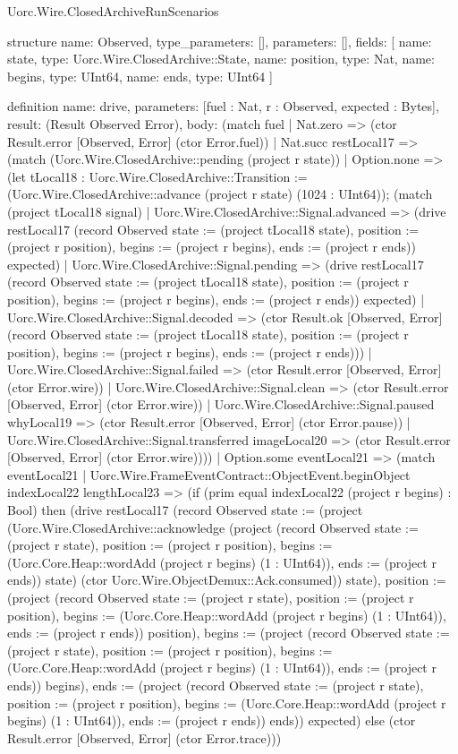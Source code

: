 \begin{lexlean}{Uorc.Wire.ClosedArchiveRunScenarios}
\begin{semanticmodule}
structure{
  name: Observed,
  type_parameters: [],
  parameters: [],
  fields: [
    {name: state, type: Uorc.Wire.ClosedArchive::State},
    {name: position, type: Nat},
    {name: begins, type: UInt64},
    {name: ends, type: UInt64}
  ]
}

definition{
  name: drive,
  parameters: [fuel : Nat, r : Observed, expected : Bytes],
  result: (Result Observed Error),
  body: (match fuel
    | Nat.zero => (ctor Result.error [Observed, Error] (ctor Error.fuel))
    | Nat.succ restLocal17 => (match (Uorc.Wire.ClosedArchive::pending (project r state))
      | Option.none => (let tLocal18 : Uorc.Wire.ClosedArchive::Transition := (Uorc.Wire.ClosedArchive::advance (project r state) (1024 : UInt64)); (match (project tLocal18 signal)
        | Uorc.Wire.ClosedArchive::Signal.advanced => (drive restLocal17 (record Observed {state := (project tLocal18 state), position := (project r position), begins := (project r begins), ends := (project r ends)}) expected)
        | Uorc.Wire.ClosedArchive::Signal.pending => (drive restLocal17 (record Observed {state := (project tLocal18 state), position := (project r position), begins := (project r begins), ends := (project r ends)}) expected)
        | Uorc.Wire.ClosedArchive::Signal.decoded => (ctor Result.ok [Observed, Error] (record Observed {state := (project tLocal18 state), position := (project r position), begins := (project r begins), ends := (project r ends)}))
        | Uorc.Wire.ClosedArchive::Signal.failed => (ctor Result.error [Observed, Error] (ctor Error.wire))
        | Uorc.Wire.ClosedArchive::Signal.clean => (ctor Result.error [Observed, Error] (ctor Error.wire))
        | Uorc.Wire.ClosedArchive::Signal.paused whyLocal19 => (ctor Result.error [Observed, Error] (ctor Error.pause))
        | Uorc.Wire.ClosedArchive::Signal.transferred imageLocal20 => (ctor Result.error [Observed, Error] (ctor Error.wire))))
      | Option.some eventLocal21 => (match eventLocal21
        | Uorc.Wire.FrameEventContract::ObjectEvent.beginObject indexLocal22 lengthLocal23 => (if (prim equal indexLocal22 (project r begins) : Bool) then (drive restLocal17 (record Observed {state := (project (Uorc.Wire.ClosedArchive::acknowledge (project (record Observed {state := (project r state), position := (project r position), begins := (Uorc.Core.Heap::wordAdd (project r begins) (1 : UInt64)), ends := (project r ends)}) state) (ctor Uorc.Wire.ObjectDemux::Ack.consumed)) state), position := (project (record Observed {state := (project r state), position := (project r position), begins := (Uorc.Core.Heap::wordAdd (project r begins) (1 : UInt64)), ends := (project r ends)}) position), begins := (project (record Observed {state := (project r state), position := (project r position), begins := (Uorc.Core.Heap::wordAdd (project r begins) (1 : UInt64)), ends := (project r ends)}) begins), ends := (project (record Observed {state := (project r state), position := (project r position), begins := (Uorc.Core.Heap::wordAdd (project r begins) (1 : UInt64)), ends := (project r ends)}) ends)}) expected) else (ctor Result.error [Observed, Error] (ctor Error.trace)))
}
\end{semanticmodule}
\end{lexlean}
